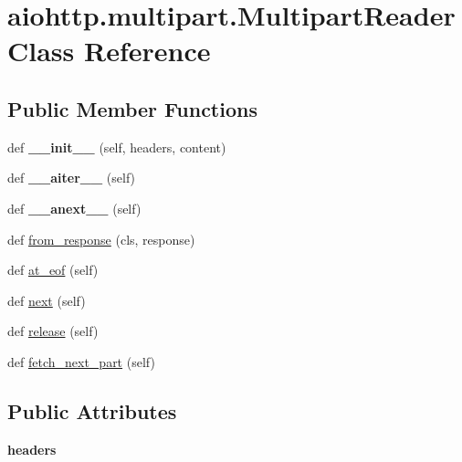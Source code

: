 \hypertarget{classaiohttp_1_1multipart_1_1_multipart_reader}{}\section{aiohttp.\+multipart.\+Multipart\+Reader Class Reference}
\label{classaiohttp_1_1multipart_1_1_multipart_reader}
\subsection*{Public Member Functions}
\begin{DoxyCompactItemize}
\item 
\mbox{\label{classaiohttp_1_1multipart_1_1_multipart_reader_a7301e401e7745ecfbd13cbc085d48c1e}} 
def {\bfseries \+\_\+\+\_\+init\+\_\+\+\_\+} (self, headers, content)
\item 
\mbox{\label{classaiohttp_1_1multipart_1_1_multipart_reader_ac5d119e14bfbd7f7c51f680e33406d58}} 
def {\bfseries \+\_\+\+\_\+aiter\+\_\+\+\_\+} (self)
\item 
\mbox{\label{classaiohttp_1_1multipart_1_1_multipart_reader_aafa61271a36d2ab023e71ff3a57797d9}} 
def {\bfseries \+\_\+\+\_\+anext\+\_\+\+\_\+} (self)
\item 
def \hyperlink{classaiohttp_1_1multipart_1_1_multipart_reader_adeb42b01a2a905a13d8a48b775ab6486}{from\+\_\+response} (cls, response)
\item 
def \hyperlink{classaiohttp_1_1multipart_1_1_multipart_reader_adc70dd5611b009b09ab56627ad98d82a}{at\+\_\+eof} (self)
\item 
def \hyperlink{classaiohttp_1_1multipart_1_1_multipart_reader_a297a2f1437b363df63a412cd05772f6a}{next} (self)
\item 
def \hyperlink{classaiohttp_1_1multipart_1_1_multipart_reader_ad42d61b96afe9308b45609f5bd208dc7}{release} (self)
\item 
def \hyperlink{classaiohttp_1_1multipart_1_1_multipart_reader_a5f631b0d766c974c7c5c52285cb4f396}{fetch\+\_\+next\+\_\+part} (self)
\end{DoxyCompactItemize}
\subsection*{Public Attributes}
\begin{DoxyCompactItemize}
\item 
\mbox{\label{classaiohttp_1_1multipart_1_1_multipart_reader_a1f656f4a7ad1746fac8bb9f435229e66}} 
{\bfseries headers}
\end{DoxyCompactItemize}
